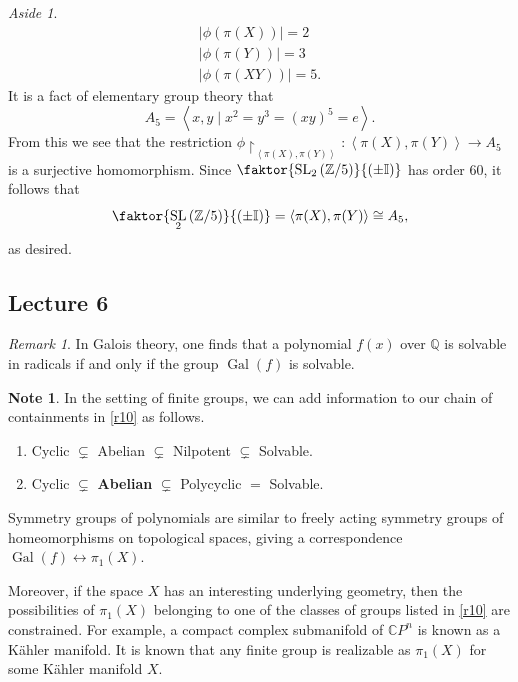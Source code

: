 \documentclass[10pt,letterpaper,cm]{nupset}
\theoremstyle{definition}
\newtheorem{note}[definition]{Note}
\theoremstyle{theorem}
\theoremstyle{remark}
\newtheorem{remark}[definition]{Remark}
\newtheorem*{aside}{Aside}
\newcommand{\CP}{\mathbb CP}
\newcommand{\Q}{\mathbb Q}
\newcommand{\I}{\mathbb I}
\newcommand{\Z}{\mathbb Z}
\newcommand{\1}{\mathbf{1}}
\newcommand{\0}{\vec 0}
\DeclareMathOperator*{\SL}{SL}
\DeclareMathOperator{\gal}{Gal}
\begin{document}
\begin{aside}
 \begin{gather*}
 \left\lvert{\phi(\pi(X))}\right\rvert = 2
 \\  \left\lvert{\phi(\pi(Y))}\right\rvert = 3
 \\ \left\lvert{\phi(\pi(XY))}\right\rvert =5.
 \end{gather*}
 It is a fact of elementary group theory that $$A_5 = \left\langle x, y \mid x^2 = y^3 = \left(xy\right)^5 = e \right\rangle.$$ From this we see that the restriction $\phi \restriction_{\left\langle \pi(X), \pi(Y) \right\rangle} : \left\langle \pi(X), \pi(Y) \right\rangle \to A_5$ is a surjective homomorphism.  Since $\faktor{\SL_2\left(\Z/5\right)}{\left(\pm \I\right)}$ has order $60$, it follows that $$\faktor{\SL_2\left(\Z/5\right)}{\left(\pm \I\right)} =  \left\langle \pi(X), \pi(Y) \right\rangle    \cong A_5,$$ as desired.
\end{aside}

\subsection{Lecture 6}

\begin{remark}
In Galois theory, one finds that a polynomial $f(x)$ over $\Q$ is solvable in radicals if and only if the group $\gal(f)$ is solvable. 
\end{remark}

\medskip

\begin{note}
In the setting of finite groups, we can add information to our chain of containments in \cref{r10} as follows.
\begin{enumerate}[label=(\roman*)]
\item Cyclic $\subsetneq$ Abelian $\subsetneq$ Nilpotent $\subsetneq$ Solvable.
\item Cyclic $\subsetneq$ \textbf{Abelian} $\subsetneq$ Polycyclic $\bm =$  Solvable.
\end{enumerate}
\end{note}

\smallskip

Symmetry groups of polynomials are similar to freely acting symmetry groups of homeomorphisms on topological spaces, giving a correspondence $\gal(f) \longleftrightarrow \pi_1(X)$. 

Moreover, if the space $X$ has an interesting underlying geometry, then the possibilities of $\pi_1(X)$ belonging to one of the classes of groups listed in \cref{r10} are constrained. For example,
a compact complex submanifold of $\CP^n$ is known as a K\"ahler manifold. It is known that any finite group is realizable as $\pi_1(X)$ for some K\"ahler manifold $X$.
\end{document}
